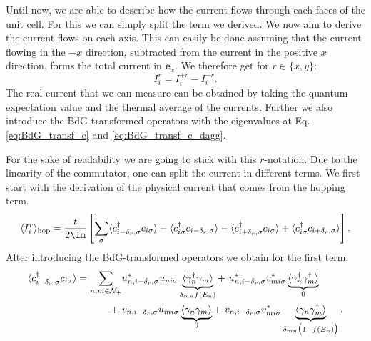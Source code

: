 \documentclass[../main.tex]{subfile}
\begin{document}
Until now, we are able to describe how the current flows through each faces of the unit cell. For this we can simply split the term we derived.
We now aim to derive the current flows on each axis.
This can easily be done assuming that the current flowing in the $-x$ direction, subtracted from the current in the positive $x$ direction, forms the total current in $\bm{e}_x$.
We therefore get for $r\in\{x,y\}$:
\[
    I_{i}^{r} = I_{i}^{+r} - I_{i}^{-r}.
\]
The real current that we can measure can be obtained by taking the quantum expectation value and the thermal average of the currents. Further we also introduce the 
BdG-transformed operators with the eigenvalues at Eq. \ref{eq:BdG_transf_c} and \ref{eq:BdG_transf_c_dagg}. 

For the sake of readability we are going to stick with this $r$-notation.
Due to the linearity of the commutator, one can split the current in different terms. We first start with the derivation of the physical current
that comes from the hopping term.
\begin{equation*}
    \begin{aligned}
    \langle I_i^r\rangle_{\text{hop}} = \frac{t}{2\im}\left[ \sum_{\sigma} 
        \langle c_{i-\delta_{r},\sigma}^{\dagger} c_{i\sigma}\rangle
        -\langle c_{i\sigma}^{\dagger}            c_{i-\delta_{r},\sigma}\rangle
        -\langle c_{i+\delta_{r},\sigma}^{\dagger} c_{i\sigma}\rangle
        +\langle c_{i\sigma}^{\dagger}            c_{i+\delta_{r},\sigma}\rangle\right].
\end{aligned}
\end{equation*}
After introducing the BdG-transformed operators we obtain for the first term:
\begin{equation*}
    \begin{aligned}
        \color{TamGreen}{\langle c_{i-\delta_r,\sigma}^{\dagger} c_{i\sigma}\rangle} \color{black}= \sum_{n,m\in\mathcal{N}_+} 
        &u_{n,i-\delta_r,\sigma}^{\ast} u_{ni\sigma} \underbrace{\langle \gamma_n^{\dagger}\gamma_m\rangle}_{\delta_{mn}f(E_n)} 
        +~ u_{n,i-\delta_r,\sigma}^{\ast} v_{mi\sigma}^{\ast} \underbrace{\langle \gamma_n^{\dagger}\gamma_m^{\dagger}\rangle}_{0}\\
        +~& v_{n,i-\delta_r,\sigma}u_{mi\sigma}\underbrace{\langle \gamma_n\gamma_m\rangle}_{0}
        +~ v_{n,i-\delta_r,\sigma}v_{mi\sigma}^{\ast}\underbrace{\langle \gamma_n\gamma_m^{\dagger}\rangle}_{\delta_{mn}\bigl(1-f(E_n)\bigr)}.
    \end{aligned}
\end{equation*}
\end{document}
